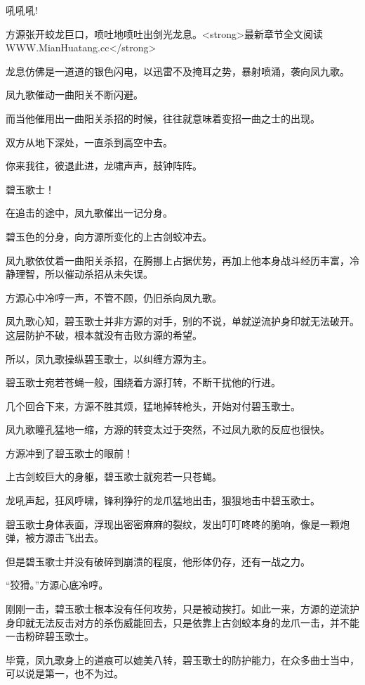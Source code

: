 
\begin{this_body}

吼吼吼!

方源张开蛟龙巨口，喷吐地喷吐出剑光龙息。<strong>最新章节全文阅读WWW.MianHuatang.cc</strong>

龙息仿佛是一道道的银色闪电，以迅雷不及掩耳之势，暴射喷涌，袭向凤九歌。

凤九歌催动一曲阳关不断闪避。

而当他催用出一曲阳关杀招的时候，往往就意味着变招一曲之士的出现。

双方从地下深处，一直杀到高空中去。

你来我往，彼退此进，龙啸声声，鼓钟阵阵。

碧玉歌士！

在追击的途中，凤九歌催出一记分身。

碧玉色的分身，向方源所变化的上古剑蛟冲去。

凤九歌依仗着一曲阳关杀招，在腾挪上占据优势，再加上他本身战斗经历丰富，冷静理智，所以催动杀招从未失误。

方源心中冷哼一声，不管不顾，仍旧杀向凤九歌。

凤九歌心知，碧玉歌士并非方源的对手，别的不说，单就逆流护身印就无法破开。这层防护不破，根本就没有击败方源的希望。

所以，凤九歌操纵碧玉歌士，以纠缠方源为主。

碧玉歌士宛若苍蝇一般，围绕着方源打转，不断干扰他的行进。

几个回合下来，方源不胜其烦，猛地掉转枪头，开始对付碧玉歌士。

凤九歌瞳孔猛地一缩，方源的转变太过于突然，不过凤九歌的反应也很快。

方源冲到了碧玉歌士的眼前！

上古剑蛟巨大的身躯，碧玉歌士就宛若一只苍蝇。

龙吼声起，狂风呼啸，锋利狰狞的龙爪猛地出击，狠狠地击中碧玉歌士。

碧玉歌士身体表面，浮现出密密麻麻的裂纹，发出叮叮咚咚的脆响，像是一颗炮弹，被方源击飞出去。

但是碧玉歌士并没有破碎到崩溃的程度，他形体仍存，还有一战之力。

“狡猾。”方源心底冷哼。

刚刚一击，碧玉歌士根本没有任何攻势，只是被动挨打。如此一来，方源的逆流护身印就无法反击对方的杀伤威能回去，只是依靠上古剑蛟本身的龙爪一击，并不能一击粉碎碧玉歌士。

毕竟，凤九歌身上的道痕可以媲美八转，碧玉歌士的防护能力，在众多曲士当中，可以说是第一，也不为过。


\end{this_body}
